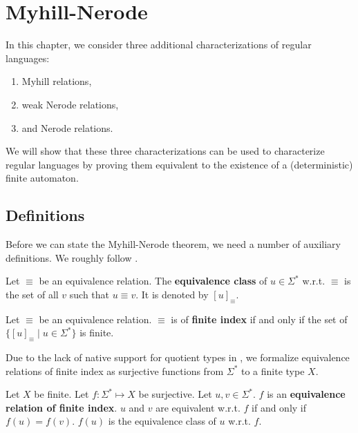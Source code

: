
\chapter{Myhill-Nerode}
\label{chap:MN}

In this chapter, we consider three additional characterizations of regular languages:

\begin{enumerate}
    \item Myhill relations,
    \item weak Nerode relations,
    \item and Nerode relations.
\end{enumerate}


We will show that these three characterizations can be used to characterize regular languages 
by proving them equivalent to the existence of a (deterministic) finite automaton.


\section{Definitions}
Before we can state the Myhill-Nerode theorem, we need a number of auxiliary definitions. We roughly follow \cite{DBLP:books/daglib/0088160}.
\begin{definition}
    Let $\equiv$ be an equivalence relation.
    The \textbf{equivalence class} of $u \in \Sigma^*$ w.r.t. $\equiv$ is the set of all $v$ such that $u \equiv v$.
    It is denoted by $[u]_\equiv$.
\end{definition}

\begin{definition}
    Let $\equiv$ be an equivalence relation.
    $\equiv$ is of \textbf{finite index} if and only if the set of $\{[u]_\equiv \; | \; u \in \Sigma^* \}$ is finite.
\end{definition}


Due to the lack of native support for quotient types in \coq, 
we formalize equivalence relations of finite index 
as surjective functions from $\Sigma^*$ to a finite type $X$.

\begin{definition}
    Let $X$ be finite.
    Let $f: \Sigma^* \mapsto X$ be surjective.
    Let $u, v \in \Sigma^*$.
    $f$ is an \textbf{equivalence relation of finite index}. 
    $u$ and $v$ are equivalent w.r.t. $f$ if and only if $f(u) = f(v)$.
    $f(u)$ is the equivalence class of $u$ w.r.t. $f$.
\end{definition}

